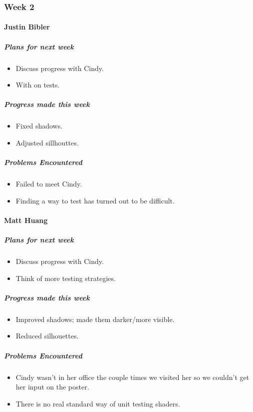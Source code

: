 \newpage

{
\subsubsection{Week 2}
\paragraph{Justin Bibler}
\subparagraph{Plans for next week}
\begin{itemize}
  \item Discuss progress with Cindy.
  \item With on tests.
\end{itemize}

\subparagraph{Progress made this week}
\begin{itemize}
  \item Fixed shadows.
  \item Adjusted sillhouttes.
\end{itemize}

\subparagraph{Problems Encountered}
\begin{itemize}
  \item Failed to meet Cindy.
  \item Finding a way to test has turned out to be difficult.
\end{itemize}
\vspace{3mm}

\paragraph{Matt Huang}
\subparagraph{Plans for next week}
\begin{itemize}
  \item Discuss progress with Cindy.
  \item Think of more testing strategies.
\end{itemize}

\subparagraph{Progress made this week}
\begin{itemize}
  \item Improved shadows; made them darker/more visible.
  \item Reduced silhouettes.
\end{itemize}

\subparagraph{Problems Encountered}
\begin{itemize}
  \item Cindy wasn't in her office the couple times we visited her so we couldn't get her input on the poster.
  \item There is no real standard way of unit testing shaders.
\end{itemize}

}
